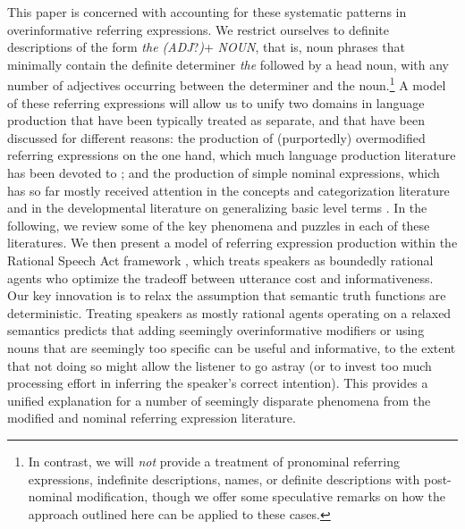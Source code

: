 \documentclass[11pt]{article}
\newcommand{\cg}[1]{\textcolor{Purple}{[cg: #1]}}
\begin{document}
This paper is concerned with accounting for these systematic patterns in overinformative referring expressions. We restrict ourselves to definite descriptions of the form \emph{the (ADJ}?\emph{)}+ \emph{NOUN}, that is, noun phrases that minimally contain the definite determiner \emph{the} followed by a head noun, with any number of adjectives occurring between the determiner and the noun.\footnote{In contrast, we will \emph{not} provide a treatment of pronominal referring expressions, indefinite descriptions, names, or definite descriptions with post-nominal modification, though we offer some speculative remarks on how the approach outlined here can be applied to these cases.} A model of these referring expressions will allow us to unify two domains in language production that have been typically treated as separate, and that have been discussed for different reasons: the production of (purportedly) overmodified referring expressions on the one hand, which much language production literature has been devoted to \cite{herrmann1976, Pechmann1989, nadig2002, sedivy2003a, Maes2004, Engelhardt2006, Arts2011, Koolen2011, rubiofernandez2016}; and the production of simple nominal expressions, which has so far mostly received attention in the concepts and categorization literature \cite{Rosch1973, Rosch1976} and in the developmental literature on  generalizing basic level terms \cite{Xu2007}. %
In the following, we review some of the key phenomena and puzzles in each of these literatures. We then present a model of referring expression production within the Rational Speech Act framework \cite{frank2012, goodman2016}, which treats speakers as boundedly rational agents who optimize the tradeoff between utterance cost and informativeness. Our key innovation is to relax the assumption that semantic truth functions are deterministic. Treating speakers as mostly rational agents operating on a relaxed semantics predicts that adding seemingly overinformative modifiers or using  nouns that are seemingly too specific can be useful and informative, to the extent that not doing so might allow the listener to go astray (or to invest too much processing effort in inferring the speaker's correct intention). This provides a unified explanation for a number of seemingly disparate phenomena from the modified and nominal referring expression literature. 
\end{document}
